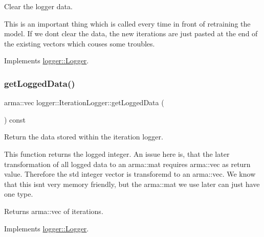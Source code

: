 Clear the logger data. 

This is an important thing which is called every time in front of retraining the model. If we don\textquotesingle{}t clear the data, the new iterations are just pasted at the end of the existing vectors which couses some troubles. 

Implements \mbox{\hyperlink{classlogger_1_1_logger_a8c68db2430fa84b67528bfa6ae45a516}{logger\+::\+Logger}}.

\mbox{\label{classlogger_1_1_iteration_logger_ab073ed2a2806372ec823aa495112cf24}} 
\subsubsection{\texorpdfstring{get\+Logged\+Data()}{getLoggedData()}}
{\footnotesize\ttfamily arma\+::vec logger\+::\+Iteration\+Logger\+::get\+Logged\+Data (\begin{DoxyParamCaption}{ }\end{DoxyParamCaption}) const\hspace{0.3cm}{\ttfamily [virtual]}}



Return the data stored within the iteration logger. 

This function returns the logged integer. An issue here is, that the later transformation of all logged data to an {\ttfamily arma\+::mat} requires {\ttfamily arma\+::vec} as return value. Therefore the std integer vector is transforemd to an {\ttfamily arma\+::vec}. We know that this isn\textquotesingle{}t very memory friendly, but the {\ttfamily arma\+::mat} we use later can just have one type.

\begin{DoxyReturn}{Returns}
{\ttfamily arma\+::vec} of iterations. 
\end{DoxyReturn}


Implements \mbox{\hyperlink{classlogger_1_1_logger_aa4fc254c532172db3404b7c0bcd17092}{logger\+::\+Logger}}.

\mbox{\label{classlogger_1_1_iteration_logger_ac4ba1eb6419eef2a3c21e9a4323aec1c}} 
